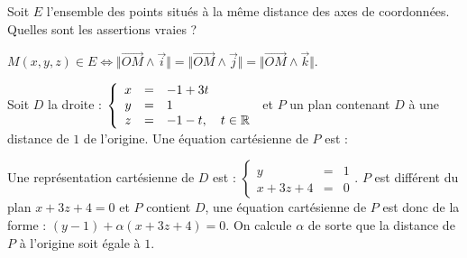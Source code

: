 \begin{question} 

Soit  $E$ l'ensemble des points situés à la même distance  des axes de coordonnées. Quelles sont les assertions vraies ?
\begin{answers}

     
       
       
      
   
\end{answers}
\begin{explanations}
$M(x,y,z) \in E \Leftrightarrow   \Vert \overrightarrow {OM} \wedge \vec{i} \Vert
 =  \Vert \overrightarrow {OM} \wedge \vec{j} \Vert =  \Vert \overrightarrow {OM} \wedge \vec{k} \Vert$.
\end{explanations}

\end{question}


\begin{question} 

Soit  $D$ la droite : $\left\{\begin{array}{ccl}x&=&-1+3t\\y&=&1\\z&=&-1-t, \quad t\in \mathbb{R}  \end{array}\right.$ et $P$ un plan contenant $D$ à une distance de $1$ de l'origine. Une équation cartésienne de $P$ est : 
\begin{answers}


     
 
    
   

       
      
   
\end{answers}
\begin{explanations}
Une représentation cartésienne de $D$ est : $\left\{\begin{array}{ccl}y&=&1\\x+3z+4&=&0  \end{array}\right.$. $P$ est différent du plan $x+3z+4=0$ et $P$ contient $D$, une équation cartésienne de $P$ est donc de la forme : $(y-1)+\alpha(x+3z+4)=0$. On calcule $\alpha$ de sorte que la distance de $P$ à l'origine soit égale à $1$.
\end{explanations}

\end{question}






